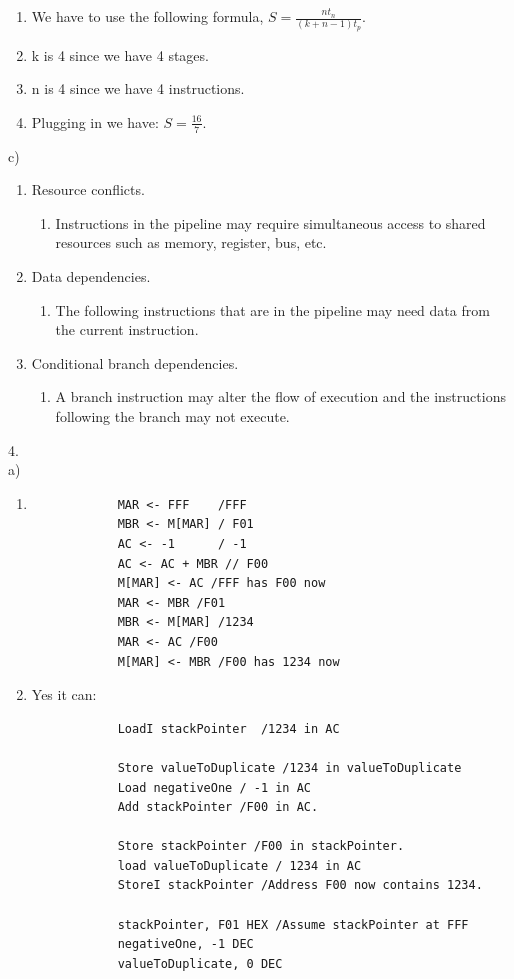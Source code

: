 \documentclass{article}
\begin{document}
\begin{enumerate}
	\item We have to use the following formula, $S = \frac{nt_n}{(k + n - 1)t_p}$.
	\item k is 4 since we have 4 stages.
	\item n is 4 since we have 4 instructions.
	\item Plugging in we have: $S = \frac{16}{7}$.
\end{enumerate}
c)
\begin{enumerate}
	\item Resource conflicts.
		\begin{enumerate}
			\item Instructions in the pipeline may require simultaneous access to shared resources such as memory, register, bus, etc.
		\end{enumerate}
	\item  Data dependencies. 
		\begin{enumerate}
			\item The following instructions that are in the pipeline may need data from the current instruction.
		\end{enumerate}
	\item Conditional branch dependencies. 
		\begin{enumerate}
			\item A branch instruction may alter the flow of execution and the instructions following the branch may not execute.
		\end{enumerate}
\end{enumerate}
4.\\
a)
\begin{enumerate}
	\item  
		\begin{verbatim}
			MAR <- FFF    /FFF
			MBR <- M[MAR] / F01
			AC <- -1      / -1
			AC <- AC + MBR // F00
			M[MAR] <- AC /FFF has F00 now
			MAR <- MBR /F01
			MBR <- M[MAR] /1234
			MAR <- AC /F00
			M[MAR] <- MBR /F00 has 1234 now
		\end{verbatim}
	\item Yes it can:
		\begin{verbatim}
			LoadI stackPointer  /1234 in AC
			
			Store valueToDuplicate /1234 in valueToDuplicate
			Load negativeOne / -1 in AC
			Add stackPointer /F00 in AC.

			Store stackPointer /F00 in stackPointer.
			load valueToDuplicate / 1234 in AC
			StoreI stackPointer /Address F00 now contains 1234.

			stackPointer, F01 HEX /Assume stackPointer at FFF
			negativeOne, -1 DEC
			valueToDuplicate, 0 DEC
		\end{verbatim}
\end{enumerate}
\end{document}
